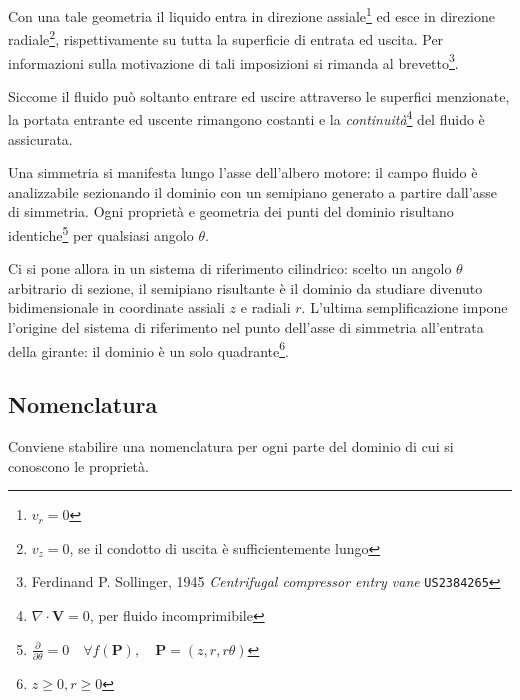 \documentclass{tufte-handout}
\newcommand{\vect}[1]{\pmb{#1}}
\begin{document}
Con una tale geometria il liquido entra in direzione 
assiale\footnote{$v_r = 0$} ed esce in direzione radiale\footnote{$v_z = 0$, se il condotto di uscita è sufficientemente lungo}, rispettivamente
su tutta la superficie di entrata ed uscita. Per informazioni sulla motivazione di tali imposizioni si
rimanda al brevetto\footnote{Ferdinand P. Sollinger, 1945 \textit{Centrifugal compressor entry vane}
\texttt{US2384265}}.

Siccome il fluido può soltanto entrare ed uscire attraverso le superfici menzionate,
la portata entrante ed uscente rimangono costanti e la \emph{continuità}\footnote{$\nabla\cdot\vect{V}=0$, per fluido incomprimibile} del fluido è assicurata.


Una simmetria si manifesta lungo l'asse dell'albero motore: il campo fluido
è analizzabile sezionando il dominio con un semipiano generato a partire dall'asse di simmetria.
Ogni proprietà e geometria dei punti del dominio risultano
identiche\footnote{$\frac{\partial}{\partial\theta}=0 \quad \forall f(\vect{P}),\quad \vect{P} = (z,r,r\theta) $}
per qualsiasi angolo $\theta$.

Ci si pone allora in un sistema di riferimento cilindrico: scelto
un angolo $\theta$ arbitrario di sezione, il semipiano risultante è il dominio da studiare
divenuto bidimensionale in coordinate assiali $z$ e radiali $r$. L'ultima semplificazione impone
l'origine del sistema di riferimento nel punto dell'asse di simmetria all'entrata della
girante: il dominio è un solo quadrante\footnote{$z \geq 0, r \geq 0 $}.

\subsection{Nomenclatura}

Conviene stabilire una nomenclatura per ogni parte del dominio di cui si conoscono le
proprietà.
\end{document}
